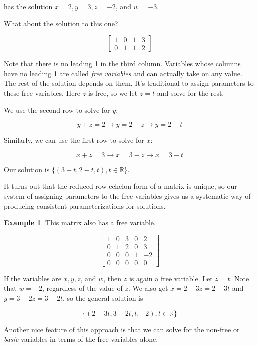 \documentclass[
]{book}
\theoremstyle{definition}
\theoremstyle{definition}
\newtheorem{example}{Example}[chapter]
\theoremstyle{definition}
\theoremstyle{definition}
\theoremstyle{remark}
\begin{document}
has the solution \(x=2,y=3,z=-2\), and \(w=-3\).

What about the solution to this one?

\[\left[\begin{array}{rrr|r}
1 & 0 & 1 & 3\\
0 & 1 & 1 & 2\end{array}\right] \]

Note that there is no leading 1 in the third column. Variables whose columns have no leading 1 are called \emph{free variables} and can actually take on any value. The rest of the solution depends on them. It's traditional to assign parameters to these free variables. Here \(z\) is free, so we let \(z=t\) and solve for the rest.

We use the second row to solve for \(y\):

\[y+z=2\to  y=2-z\to y=2-t\]

Similarly, we can use the first row to solve for \(x\):

\[x+z=3\to x=3-z\to x=3-t\]

Our solution is \(\{(3-t,2-t,t),t\in\mathbb{R}\}\).

It turns out that the reduced row echelon form of a matrix is unique, so our system of assigning parameters to the free variables gives us a systematic way of producing consistent parameterizations for solutions.

\begin{examplebox}

\begin{example}
This matrix also has a free variable.

\[\left[\begin{array}{rrrr|r}
1 & 0 & 3 & 0 & 2\\
0 & 1 & 2 & 0 & 3\\
0 & 0 & 0 & 1 & -2\\
0 & 0 & 0 & 0 & 0\end{array}\right] \]

If the variables are \(x,y,z\), and \(w\), then \(z\) is again a free variable. Let \(z=t\).
Note that \(w=-2\), regardless of the value of \(z\). We also get \(x=2-3z=2-3t\) and \(y=3-2z=3-2t\), so the general solution is

\[\{(2-3t,3-2t,t,-2),t\in\mathbb{R}\}\]

Another nice feature of this approach is that we can solve for the non-free or \emph{basic} variables in terms of the free variables alone.
\end{example}

\end{examplebox}
\end{document}
